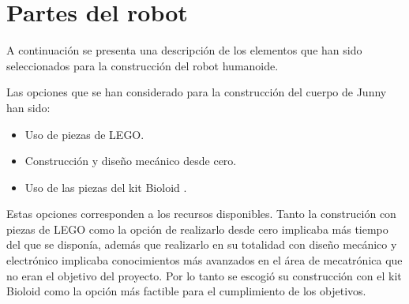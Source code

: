 

\section{Partes del robot}\label{sec:diseno}

A continuación se presenta una descripción de los elementos que han sido seleccionados para la construcción del robot humanoide. 

Las opciones que se han considerado para la construcci\'on del cuerpo de Junny han sido: 
\begin{itemize}[noitemsep,nolistsep]
  \item Uso de piezas de \gls{LEGO}.
  \item Construcci\'on y dise\~no mec\'anico desde cero.
  \item Uso de las piezas del kit Bioloid \cite{robotics}.
\end{itemize}

Estas opciones corresponden a los recursos disponibles. Tanto la construci\'on con piezas de \gls{LEGO} como la opci\'on de realizarlo desde cero implicaba más tiempo del que se disponía, adem\'as que realizarlo en su totalidad con dise\~no mec\'anico y electr\'onico implicaba conocimientos m\'as avanzados en el \'area de mecatr\'onica que no eran el objetivo del proyecto. Por lo tanto se escogi\'o su construcci\'on con el kit Bioloid como la opci\'on m\'as factible para el cumplimiento de los objetivos. 

